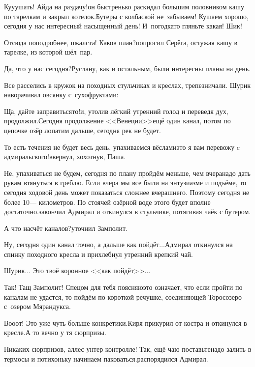 \diagdash Ку\sdash у\sdash ушать! Айда на раздачу!\mdash он быстренько раскидал большим половником кашу по тарелкам и закрыл котелок.\mdash Бутеры с колбаской не~забываем! Кушаем хорошо, сегодня у нас интересный насыщенный день! И~погодка\sdash то гляньте какая! Шик!

\diagdash Отсюда поподробнее, п\sdash жалста! Каков план?\mdash попросил Серёга, остужая кашу в тарелке, из которой шёл~пар.

\diagdash Да, что у нас сегодня?\mdash Руслану, как и остальным, были интересны планы на день.

Все расселись в кружок на походных стульчиках и креслах, трепезничали. Шурик наворачивал овсянку с~сухофруктами:

\diagdash Ща, дайте заправиться\sdash то!\mdash и, утолив лёгкий утренний голод и переведя дух, продолжил.\mdash Сегодня продолжение <<Венеции>>\mdash ещё один канал, потом по цепочке озёр лопатим дальше, сегодня рек не будет.

\diagdash То есть течения не будет весь день, упахиваемся вёслами\mdash это я вам перевожу c адмиральского!\mdash ввернул, хохотнув, Паша.

\diagdash Не, упахиваться не будем, сегодня по плану пройдём меньше, чем вчера\mdash надо дать рукам втянуться в греблю. Если вчера мы все были на энтузиазме и подъёме, то сегодня ходовой день может показаться сложнее вчерашнего. Поэтому сегодня не более 10\thinspace\nobreakdash--- километров. По стоячей озёрной воде этого будет вполне достаточно.\mdash закончил Адмирал и откинулся в стульчике, потягивая чаёк с бутером.

\diagdash А что насчёт каналов?\mdash уточнил Замполит.

\diagdash Ну, сегодня один канал точно, а дальше как пойдёт$\ldots$\mdash Адмирал откинулся на спинку походного кресла и прихлебнул утренний крепкий чай.

\diagdash Шурик$\ldots$ Это твоё коронное <<как пойдёт>>$\ldots$

\diagdash Так! Тащ Замполит! Спецом для тебя поясняю\mdash это означает, что если пройти по каналам не удастся, то пойдём по короткой речушке, соединяющей Торосозеро с~озером Мярандукса.

\diagdash Во\sdash о\sdash от! Это уже чуть больше конкретики.\mdash Киря прикурил от костра и откинулся в кресле.\mdash А то вечно у тя сюрпризы.

\diagdash Никаких сюрпризов, аллес унтер контролле! Так, ещё чаю поставьте\mdash надо залить в термосы и потихоньку начинаем паковаться.\mdash распорядился Адмирал.

